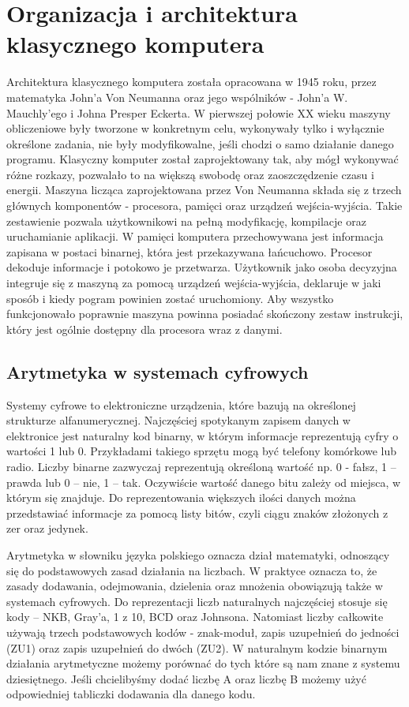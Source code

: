 \documentclass[12pt, a4paper, onside, polish]{article}				%
\begin{document}
\section{Organizacja i architektura klasycznego komputera}
\hspace{\parindent}
Architektura klasycznego komputera została opracowana w 1945 roku, przez matematyka John’a Von Neumanna oraz jego wspólników - John’a W. Mauchly’ego i Johna Presper Eckerta. W pierwszej połowie XX wieku maszyny obliczeniowe były tworzone w konkretnym celu, wykonywały tylko i wyłącznie określone zadania, nie były modyfikowalne, jeśli chodzi o samo działanie danego programu. Klasyczny komputer został zaprojektowany tak, aby mógł wykonywać różne rozkazy, pozwalało to na większą swobodę oraz zaoszczędzenie czasu i energii. Maszyna licząca zaprojektowana przez Von Neumanna składa się z trzech głównych komponentów - procesora, pamięci oraz urządzeń wejścia-wyjścia. Takie zestawienie pozwala użytkownikowi na pełną modyfikację, kompilacje oraz uruchamianie aplikacji. W pamięci komputera przechowywana jest informacja zapisana w postaci binarnej, która jest przekazywana łańcuchowo. Procesor dekoduje informacje i potokowo je przetwarza. Użytkownik jako osoba decyzyjna integruje się z maszyną za pomocą urządzeń wejścia-wyjścia, deklaruje w jaki sposób i kiedy pogram powinien zostać uruchomiony. Aby wszystko funkcjonowało poprawnie maszyna powinna posiadać skończony zestaw instrukcji, który jest ogólnie dostępny dla procesora wraz z danymi. 
\cleardoublepage

 
\subsection{Arytmetyka w systemach cyfrowych}
\hspace{\parindent}
Systemy cyfrowe to elektroniczne urządzenia, które bazują na określonej strukturze alfanumerycznej. Najczęściej spotykanym zapisem danych w elektronice jest naturalny kod binarny, w którym informacje reprezentują cyfry o wartości 1 lub 0.  Przykładami takiego sprzętu mogą być telefony komórkowe lub radio. Liczby binarne zazwyczaj reprezentują określoną wartość np. 0 - fałsz, 1 – prawda lub 0 – nie, 1 – tak. Oczywiście wartość danego bitu zależy od miejsca, w którym się znajduje. Do reprezentowania większych ilości danych można przedstawiać informacje za pomocą listy bitów, czyli ciągu znaków złożonych z zer oraz jedynek. 

Arytmetyka w słowniku języka polskiego oznacza dział matematyki, odnoszący się do podstawowych zasad działania na liczbach. W praktyce oznacza to, że zasady dodawania, odejmowania, dzielenia oraz mnożenia obowiązują także w systemach cyfrowych. Do reprezentacji liczb naturalnych najczęściej stosuje się kody – NKB, Gray’a, 1 z 10, BCD oraz Johnsona. Natomiast liczby całkowite używają trzech podstawowych kodów - znak-moduł, zapis uzupełnień do jedności (ZU1) oraz zapis uzupełnień do dwóch (ZU2). W naturalnym kodzie binarnym działania arytmetyczne możemy porównać do tych które są nam znane z systemu dziesiętnego. Jeśli chcielibyśmy dodać liczbę A oraz liczbę B możemy użyć odpowiedniej tabliczki dodawania dla danego kodu. 
\end{document}
